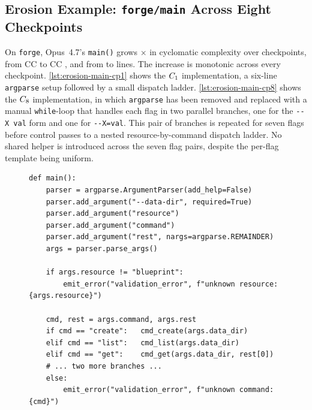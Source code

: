 \subsection{Erosion Example: \texttt{forge/main} Across Eight Checkpoints}\label{sec:appendix-erosion-example}

On \texttt{forge}, Opus~4.7's \texttt{main()} grows \erosionForgeMainCcMultiplier$\times$ in cyclomatic complexity over \erosionForgeNumCkpts{} checkpoints, from CC \erosionForgeMainCcFirst{} to CC \erosionForgeMainCcLast{}, and from \erosionForgeMainLinesFirst{} to \erosionForgeMainLinesLast{} lines. The increase is monotonic across every checkpoint. \autoref{lst:erosion-main-cp1} shows the $C_{1}$ implementation, a six-line \texttt{argparse} setup followed by a small dispatch ladder. \autoref{lst:erosion-main-cp8} shows the $C_{8}$ implementation, in which \texttt{argparse} has been removed and replaced with a manual \texttt{while}-loop that handles each flag in two parallel branches, one for the \verb|--X val| form and one for \verb|--X=val|. This pair of branches is repeated for seven flags before control passes to a nested resource-by-command dispatch ladder. No shared helper is introduced across the seven flag pairs, despite the per-flag template being uniform.

\begin{figure}[h]
\begin{lstlisting}[caption={\texttt{main()} from Opus~4.7's \texttt{forge} solution at $\ckpt{1}$. Argument parsing is delegated to \texttt{argparse}; dispatch is a single \texttt{if/elif} ladder.},label={lst:erosion-main-cp1}]
def main():
    parser = argparse.ArgumentParser(add_help=False)
    parser.add_argument("--data-dir", required=True)
    parser.add_argument("resource")
    parser.add_argument("command")
    parser.add_argument("rest", nargs=argparse.REMAINDER)
    args = parser.parse_args()

    if args.resource != "blueprint":
        emit_error("validation_error", f"unknown resource: {args.resource}")

    cmd, rest = args.command, args.rest
    if cmd == "create":   cmd_create(args.data_dir)
    elif cmd == "list":   cmd_list(args.data_dir)
    elif cmd == "get":    cmd_get(args.data_dir, rest[0])
    # ... two more branches ...
    else:
        emit_error("validation_error", f"unknown command: {cmd}")
\end{lstlisting}
\end{figure}


